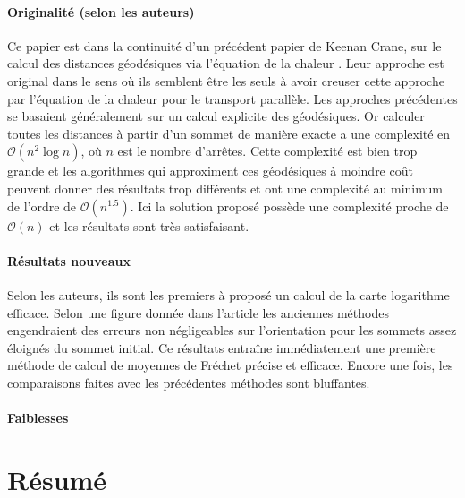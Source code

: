 \documentclass[11pt]{article}
\begin{document}
	\paragraph{Originalité (selon les auteurs)}
	Ce papier est dans la continuité d'un précédent papier de Keenan Crane, sur le calcul des distances géodésiques via l'équation de la chaleur \cite{HM}. Leur approche est original dans le sens où ils semblent être les seuls à avoir creuser cette approche par l'équation de la chaleur pour le transport parallèle. Les approches précédentes se basaient généralement sur un calcul explicite des géodésiques. Or calculer toutes les distances à partir d'un sommet de manière exacte a une complexité en $\mathcal{O}(n^2 \log n)$, où $n$ est le nombre d'arrêtes. Cette complexité est bien trop grande et les algorithmes qui approximent ces géodésiques à moindre coût peuvent donner des résultats trop différents et ont une complexité au minimum de l'ordre de $\mathcal{O}(n^{1.5})$. Ici la solution proposé possède une complexité proche de $\mathcal{O}(n)$ et les résultats sont très satisfaisant.
	
	\paragraph{Résultats nouveaux}
	Selon les auteurs, ils sont les premiers à proposé un calcul de la carte logarithme efficace. Selon une figure donnée dans l'article les anciennes méthodes engendraient des erreurs non négligeables sur l'orientation pour les sommets assez éloignés du sommet initial. Ce résultats entraîne immédiatement une première méthode de calcul de moyennes de Fréchet précise et efficace. Encore une fois, les comparaisons faites avec les précédentes méthodes sont bluffantes.
	
	\paragraph{Faiblesses}
	
	\section{Résumé}
	
\end{document}
